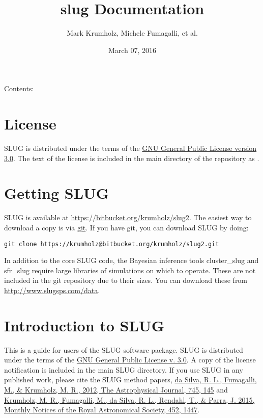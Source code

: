 \documentclass[letterpaper,10pt,english]{sphinxmanual}
\title{slug Documentation}
\date{March 07, 2016}
\author{Mark Krumholz, Michele Fumagalli, et al.}
\begin{document}
\maketitle
\tableofcontents
{}\label{index::doc}


Contents:


\chapter{License}
\label{license::doc}\label{license:welcome-to-slug-s-documentation}\label{license:license}
SLUG is distributed under the terms of the \href{http://www.gnu.org/copyleft/gpl.html}{GNU General Public License version 3.0}. The text of the license is included in the main directory of the repository as .


\chapter{Getting SLUG}
\label{getting:getting-slug}\label{getting::doc}
SLUG is available at \href{https://bitbucket.org/krumholz/slug2}{https://bitbucket.org/krumholz/slug2}. The easiest way to download a copy is via \href{http://git-scm.com/}{git}. If you have git, you can download SLUG by doing:

\begin{Verbatim}[commandchars=\\\{\}]
git clone https://krumholz@bitbucket.org/krumholz/slug2.git
\end{Verbatim}

In addition to the core SLUG code, the Bayesian inference tools cluster\_slug and sfr\_slug require large libraries of simulations on which to operate. These are not included in the git repository due to their sizes. You can download these from \href{http://www.slugsps.com/data}{http://www.slugsps.com/data}.


\chapter{Introduction to SLUG}
\label{intro:introduction-to-slug}\label{intro::doc}
This is a guide for users of the SLUG software package. SLUG is distributed under the terms of the \href{http://www.gnu.org/licenses/gpl.html}{GNU General Public License v. 3.0}. A copy of the license notification is included in the main SLUG directory. If you use SLUG in any published work, please cite the SLUG method papers, \href{http://adsabs.harvard.edu/abs/2012ApJ...745..145D}{da Silva, R. L., Fumagalli, M., \& Krumholz, M. R., 2012, The Astrophysical Journal, 745, 145} and \href{http://adsabs.harvard.edu/abs/2015MNRAS.452.1447K}{Krumholz, M. R., Fumagalli, M., da Silva, R. L., Rendahl, T., \& Parra, J. 2015, Monthly Notices of the Royal Astronomical Society, 452, 1447}.
\end{document}
